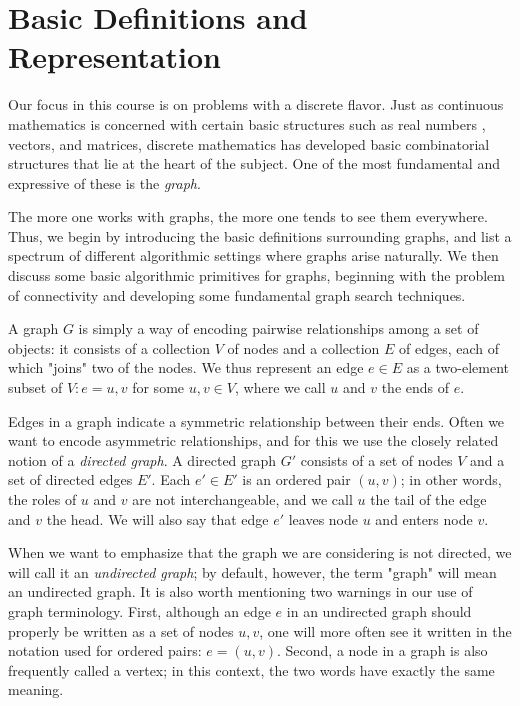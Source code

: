 \documentclass[12pt,a4paper]{book}
\begin{document}
\section{Basic Definitions and Representation }
Our focus in this course is on problems with a discrete flavor. Just as continuous mathematics is concerned with certain basic structures such as real numbers , vectors, and matrices, discrete mathematics has developed basic combinatorial structures that lie at the heart of the subject. One of the most fundamental  and expressive of these is the \textit{graph}.\par
The more one works with graphs, the more one tends to see them everywhere. Thus, we begin by introducing the basic definitions surrounding graphs, and list a spectrum of different algorithmic settings where graphs arise naturally. We then discuss some basic algorithmic primitives for graphs, beginning with the problem of connectivity and developing some fundamental graph search techniques.\par
A graph $G$ is simply a way of encoding pairwise relationships among a set of objects: it consists of a collection $V$ of nodes and a collection $E$ of edges, each of which "joins" two of the nodes. We thus represent an edge $e \in E$ as a two-element subset of $V: e = {u, v}$ for some $u,v \in V$, where we call $u$ and $v$ the ends of $e$.\par
Edges in a graph indicate a symmetric relationship between their ends. Often we want to encode asymmetric relationships, and for this we use the closely related notion of a \textit{directed graph}. A directed graph $G'$ consists of a set of nodes $V$ and a set of directed edges $E'$. Each $e' \in E'$ is an ordered pair $(u, v)$; in other words, the roles of $u$ and $v$ are not interchangeable, and we call $u$ the tail of the edge and $v$ the head. We will also say that edge $e'$ leaves node $u$ and enters node $v$.\par
When we want to emphasize that the graph we are considering is not directed, we will call it an \textit{undirected graph}; by default, however, the term "graph" will mean an undirected graph. It is also worth mentioning two warnings in our use of graph terminology. First, although an edge $e$ in an undirected graph should properly be written as a set of nodes ${u, v}$, one will more often see it written in the notation used for ordered pairs: $e = (u, v)$. Second, a node in a graph is also frequently called a vertex; in this context, the two words have exactly the same meaning.\par 
\end{document}
